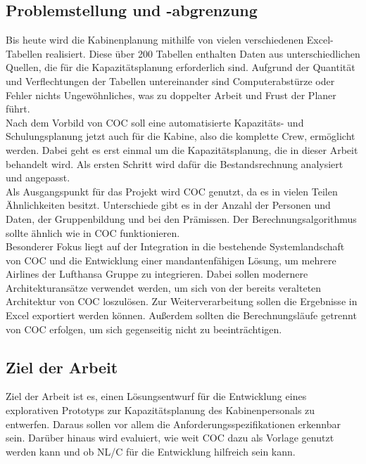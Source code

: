 \documentclass [12pt, a4paper, oneside, titlepage, ngerman]{article}
\begin{document}
\subsection {Problemstellung und -abgrenzung}
Bis heute wird die Kabinenplanung mithilfe von vielen verschiedenen Excel-Tabellen realisiert. Diese über 200 Tabellen enthalten Daten aus unterschiedlichen Quellen, die für die Kapazitätsplanung erforderlich sind. Aufgrund der Quantität und Verflechtungen der Tabellen untereinander sind Computerabstürze oder Fehler nichts Ungewöhnliches, was zu doppelter Arbeit und Frust der Planer führt. \\
Nach dem Vorbild von \ac{COC} soll eine automatisierte Kapazitäts- und Schulungsplanung jetzt auch für die Kabine, also die komplette Crew, ermöglicht werden. Dabei geht es erst einmal um die Kapazitätsplanung, die in dieser Arbeit behandelt wird. Als ersten Schritt wird dafür die Bestandsrechnung analysiert und angepasst.\\
Als Ausgangspunkt für das Projekt wird \ac{COC} genutzt, da es in vielen Teilen Ähnlichkeiten besitzt. Unterschiede gibt es in der Anzahl der Personen und Daten, der Gruppenbildung und bei den Prämissen. Der Berechnungsalgorithmus sollte ähnlich wie in \ac{COC} funktionieren. \\
Besonderer Fokus liegt auf der Integration in die bestehende Systemlandschaft von \ac{COC} und die Entwicklung einer mandantenfähigen Lösung, um mehrere Airlines der Lufthansa Gruppe zu integrieren. Dabei sollen modernere Architekturansätze verwendet werden, um sich von der bereits veralteten Architektur von \ac{COC} loszulösen.
Zur Weiterverarbeitung sollen die Ergebnisse in Excel exportiert werden können. Außerdem sollten die Berechnungsläufe getrennt von \ac{COC} erfolgen, um sich gegenseitig nicht zu beeinträchtigen.

\subsection {Ziel der Arbeit}
Ziel der Arbeit ist es, einen Lösungsentwurf für die Entwicklung eines explorativen Prototyps zur Kapazitätsplanung des Kabinenpersonals zu entwerfen. Daraus sollen vor allem die Anforderungsspezifikationen erkennbar sein. Darüber hinaus wird evaluiert, wie weit \ac{COC} dazu als Vorlage genutzt werden kann und ob \ac{NL/C} für die Entwicklung hilfreich sein kann.
\end{document}

